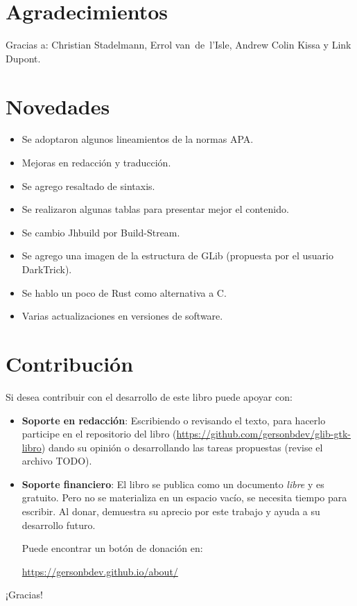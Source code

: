 \section{Agradecimientos}
    Gracias a: Christian Stadelmann, Errol van~de~l'Isle, Andrew Colin Kissa y Link Dupont.

\newpage

\section{Novedades}

     \begin{itemize}
         \item Se adoptaron algunos lineamientos de la normas APA.
         \item Mejoras en redacción y traducción.
         \item Se agrego resaltado de sintaxis.
         \item Se realizaron algunas tablas para presentar mejor el contenido.
         \item Se cambio Jhbuild por Build-Stream.
         \item Se agrego una imagen de la estructura de GLib (propuesta por el usuario DarkTrick).
         \item Se hablo un poco de Rust como alternativa a C.
         \item Varias actualizaciones en versiones de software.
     \end{itemize}

\section{Contribución}

    \noindent
    Si desea contribuir con el desarrollo de este libro puede apoyar con:
    
    \begin{itemize}
        \item \textbf{Soporte en redacción}: Escribiendo o revisando el texto, para hacerlo participe en el repositorio del libro (\url{https://github.com/gersonbdev/glib-gtk-libro}) dando su opinión o desarrollando las tareas propuestas (revise el archivo TODO).
        
        \item \textbf{Soporte financiero}: El libro se publica como un documento \emph{libre} y es gratuito. Pero no se materializa en un espacio vacío, se necesita tiempo para escribir. Al donar, demuestra su aprecio por este trabajo y ayuda a su desarrollo futuro.
        
        Puede encontrar un botón de donación en:
    
        \url{https://gersonbdev.github.io/about/}
        
    \end{itemize}
    
    ¡Gracias!
